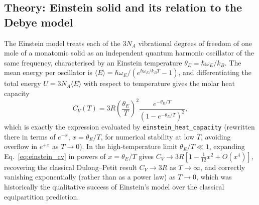 \documentclass[11pt]{article}
\begin{document}
\subsection{Theory: Einstein solid and its relation to the Debye model}
The Einstein model treats each of the $3N_A$ vibrational degrees of freedom of one mole of a monatomic solid as an independent quantum harmonic oscillator of the same frequency, characterised by an Einstein temperature $\theta_E = \hbar\omega_E/k_B$. The mean energy per oscillator is $\langle E\rangle = \hbar\omega_E/(e^{\hbar\omega_E/k_BT}-1)$, and differentiating the total energy $U=3N_A\langle E\rangle$ with respect to temperature gives the molar heat capacity
\begin{equation}
\label{eq:einstein_cv}
C_V(T) = 3R\left(\frac{\theta_E}{T}\right)^2 \frac{e^{-\theta_E/T}}{\left(1-e^{-\theta_E/T}\right)^2},
\end{equation}
which is exactly the expression evaluated by \texttt{einstein\_heat\_capacity} (rewritten there in terms of $e^{-x}$, $x=\theta_E/T$, for numerical stability at low $T$, avoiding overflow in $e^{+x}$ as $T\to0$). In the high-temperature limit $\theta_E/T\ll1$, expanding Eq.~\eqref{eq:einstein_cv} in powers of $x=\theta_E/T$ gives $C_V \to 3R\left[1-\tfrac{1}{12}x^2+O(x^4)\right]$, recovering the classical Dulong--Petit result $C_V\to3R$ as $T\to\infty$, and correctly vanishing exponentially (rather than as a power law) as $T\to0$, which was historically the qualitative success of Einstein's model over the classical equipartition prediction.
\end{document}
